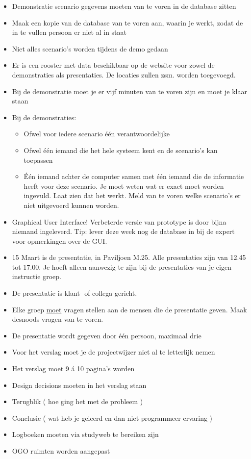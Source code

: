 \documentclass[]{article}
\begin{document}
  \begin{itemize}
    \item Demonstratie scenario gegevens moeten van te voren in de database zitten
   
    \item Maak een kopie van de database van te voren aan, waarin je werkt, zodat de in te vullen persoon er niet al in staat
    \item Niet alles scenario's worden tijdens de demo gedaan
    \item Er is een rooster met data beschikbaar op de website voor zowel de demonstraties als presentaties. De locaties zullen zsm. worden toegevoegd.
    \item Bij de demonstratie moet je er vijf minuten van te voren zijn en moet je klaar staan
    \item Bij de demonstraties:

 	\begin{itemize}
 		\item Ofwel voor iedere scenario \'e\'en verantwoordelijke
 		\item Ofwel \'e\'en iemand die het hele systeem kent en de scenario's kan toepassen
 		\item \'E\'en iemand achter de computer samen met \'e\'en iemand die de informatie heeft voor deze scenario. Je moet weten wat er exact moet worden ingevuld. Laat zien dat het werkt. Meld van te voren welke scenario's er niet uitgevoerd kunnen worden.
 	\end{itemize}

 	\item Graphical User Interface! Verbeterde versie van prototype is door bijna niemand ingeleverd. Tip: lever deze week nog de database in bij de expert voor opmerkingen over de GUI.
 	\item 15 Maart is de presentatie, in Paviljoen M.25. Alle presentaties zijn van 12.45 tot 17.00. Je hoeft alleen aanwezig te zijn bij de presentaties van je eigen instructie groep.
 	\item De presentatie is klant- of collega-gericht.
 	\item Elke groep \underline{moet} vragen stellen aan de mensen die de presentatie geven. Maak desnoods vragen van te voren.
 	\item De presentatie wordt gegeven door \'e\'en persoon, maximaal drie 
 	\item Voor het verslag moet je de projectwijzer niet al te letterlijk nemen
 	\item Het verslag moet 9 \'a 10 pagina's worden
 	\item Design decisions moeten in het verslag staan
 	\item Terugblik ( hoe ging het met de probleem )
 	\item Conclusie ( wat heb je geleerd en dan niet programmeer ervaring )
 	\item Logboeken moeten via studyweb te bereiken zijn
 	\item OGO ruimten worden aangepast

  \end{itemize}
\end{document}
